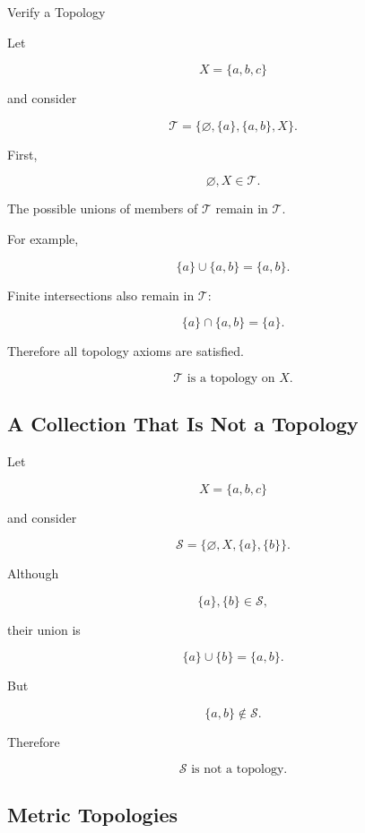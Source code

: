 \begin{workedexamplebox}{Verify a Topology}

Let

\[
X=\{a,b,c\}
\]

and consider

\[
\mathcal{T}
=
\{
\varnothing,
\{a\},
\{a,b\},
X
\}.
\]

First,

\[
\varnothing,X\in\mathcal{T}.
\]

The possible unions of members of \(\mathcal{T}\) remain in
\(\mathcal{T}\).

For example,

\[
\{a\}\cup\{a,b\}
=
\{a,b\}.
\]

Finite intersections also remain in \(\mathcal{T}\):

\[
\{a\}\cap\{a,b\}
=
\{a\}.
\]

Therefore all topology axioms are satisfied.

\begin{answerbox}
\[
\boxed{
\mathcal{T}
\text{ is a topology on }X.
}
\]
\end{answerbox}
\end{workedexamplebox}

\subsection{A Collection That Is Not a Topology}
\label{subsec:not-a-topology-example}

Let

\[
X=\{a,b,c\}
\]

and consider

\[
\mathcal{S}
=
\{
\varnothing,
X,
\{a\},
\{b\}
\}.
\]

Although

\[
\{a\},\{b\}\in\mathcal{S},
\]

their union is

\[
\{a\}\cup\{b\}
=
\{a,b\}.
\]

But

\[
\{a,b\}\notin\mathcal{S}.
\]

Therefore

\[
\boxed{
\mathcal{S}
\text{ is not a topology}.
}
\]

\subsection{Metric Topologies}
\label{subsec:metric-topologies}

